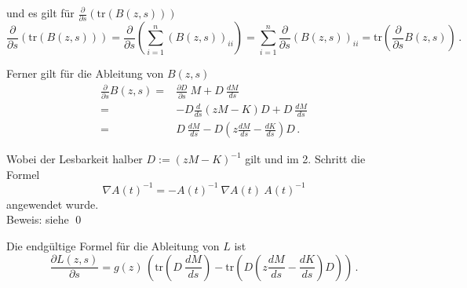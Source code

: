\documentclass[a4paper,12pt]{report}
\newcommand{\R}{\mathbb R}
\newcommand{\C}{\mathbb C}
\newcommand{\klammer}[1]{\left(#1\right)}
\newcommand{\tr}{\text{tr}}
\newcommand{\Cnn}{\C^{n\times n}}
\newcommand{\inv}{^{-1}}
\newcommand{\1}{\mathds{1}}
\theoremstyle{plain} %
\theoremstyle{definition} %
\theoremstyle{remark}
\begin{document}
            und es gilt für $\frac{\partial}{\partial s} \klammer{\tr(B(z, s))}$
            $$\frac{\partial}{\partial s} \klammer{\tr(B(z, s))} = \frac{\partial}{\partial s} \klammer{\sum_{i=1}^n (B(z, s))_{ii}}
            = \sum_{i=1}^n \frac{\partial}{\partial s} (B(z,s))_{ii} = \tr\klammer{\frac{\partial}{\partial s} B(z,s)}\,.$$
            
            Ferner gilt für die Ableitung von $B(z,s)$
            \begin{align*}
                  \frac{\partial}{\partial s} B(z, s) =& \frac{\partial D}{\partial s} \ M + D \ \frac{dM}{ds}\\
                  =& - D \frac{d}{ds}(zM-K) D + D \ \frac{dM}{ds}\\
                  =& D \ \frac{dM}{ds} - D \klammer{z \frac{dM}{ds}-\frac{dK}{ds}} D\,.
            \end{align*}

            Wobei der Lesbarkeit halber $D:=(zM-K)\inv$ gilt und im 2. Schritt die Formel
            $$\nabla A(t)\inv = -A(t)\inv\ \nabla A(t)\ A(t)\inv$$
            angewendet wurde.\\
            Beweis: siehe \cite{derivativeInverseMatrix}\qed

            Die endgültige Formel für die Ableitung von $L$ ist
            \begin{equation}
                  \label{eqn: vollständigeAblL}
                  \frac{\partial L(z,s)}{\partial s} = g(z)\,\klammer{\tr\klammer{D \ \frac{dM}{ds}} - \tr\klammer{D \klammer{z \frac{dM}{ds}-\frac{dK}{ds}} D}}\,.
            \end{equation}
            



\end{document}
